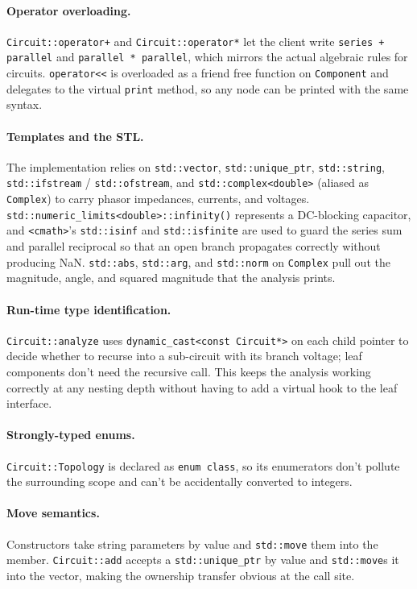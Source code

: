 \documentclass[11pt]{article}
\begin{document}
\paragraph{Operator overloading.}
\texttt{Circuit::operator+} and \texttt{Circuit::operator*} let the client
write \texttt{series + parallel} and \texttt{parallel * parallel}, which
mirrors the actual algebraic rules for circuits. \texttt{operator<<} is
overloaded as a friend free function on \texttt{Component} and delegates
to the virtual \texttt{print} method, so any node can be printed with the
same syntax.

\paragraph{Templates and the STL.}
The implementation relies on \texttt{std::vector}, \texttt{std::unique\_ptr},
\texttt{std::string}, \texttt{std::ifstream} / \texttt{std::ofstream}, and
\texttt{std::complex<double>} (aliased as \texttt{Complex}) to carry
phasor impedances, currents, and voltages. \texttt{std::numeric\_limits<double>::infinity()}
represents a DC-blocking capacitor, and \texttt{<cmath>}'s \texttt{std::isinf}
and \texttt{std::isfinite} are used to guard the series sum and parallel
reciprocal so that an open branch propagates correctly without producing
NaN. \texttt{std::abs}, \texttt{std::arg}, and \texttt{std::norm} on
\texttt{Complex} pull out the magnitude, angle, and squared magnitude
that the analysis prints.

\paragraph{Run-time type identification.}
\texttt{Circuit::analyze} uses \texttt{dynamic\_cast<const Circuit*>} on
each child pointer to decide whether to recurse into a sub-circuit with
its branch voltage; leaf components don't need the recursive call. This
keeps the analysis working correctly at any nesting depth without having
to add a virtual hook to the leaf interface.

\paragraph{Strongly-typed enums.}
\texttt{Circuit::Topology} is declared as \texttt{enum class}, so its
enumerators don't pollute the surrounding scope and can't be accidentally
converted to integers.

\paragraph{Move semantics.}
Constructors take string parameters by value and \texttt{std::move} them
into the member. \texttt{Circuit::add} accepts a \texttt{std::unique\_ptr}
by value and \texttt{std::move}s it into the vector, making the ownership
transfer obvious at the call site.
\end{document}
